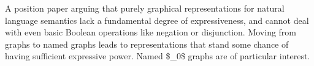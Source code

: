 A position paper arguing that purely graphical representations for natural language semantics lack a fundamental degree of expressiveness, and cannot deal with even basic Boolean operations like negation or disjunction. Moving from graphs to named graphs leads to representations that stand some chance of having sufficient expressive power. Named \$\_0\$ graphs are of particular interest.
